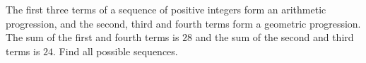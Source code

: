 The first three terms of a sequence of positive integers form an arithmetic progression, and the second, third and fourth terms form a geometric progression. The sum of the first and fourth terms is $28$ and the sum of the second and third terms is $24$. Find all possible sequences.
